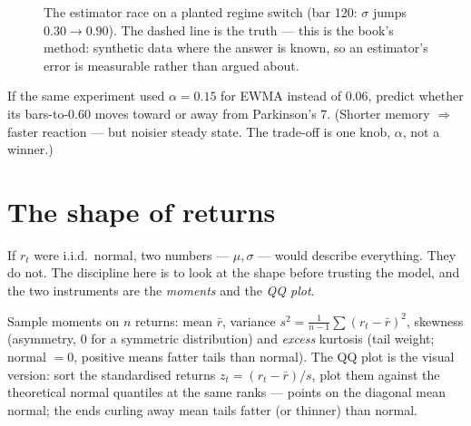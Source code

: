 \begin{figure}[ht]\centering

\caption{The estimator race on a planted regime switch (bar 120:
$\sigma$ jumps $0.30\to0.90$). The dashed line is the truth --- this
is the book's method: synthetic data where the answer is known, so an
estimator's error is measurable rather than argued about.}
\label{fig:volest}
\end{figure}

\begin{checkpoint}
If the same experiment used $\alpha=0.15$ for EWMA instead of
$0.06$, predict whether its bars-to-$0.60$ moves toward or away from
Parkinson's 7. (Shorter memory $\Rightarrow$ faster reaction --- but
noisier steady state. The trade-off is one knob, $\alpha$, not a
winner.)
\end{checkpoint}

\section{The shape of returns}\label{sec:shape}
If $r_t$ were i.i.d.\ normal, two numbers --- $\mu,\sigma$ --- would
describe everything. They do not. The discipline here is to look at
the shape before trusting the model, and the two instruments are the
\emph{moments} and the \emph{QQ plot}.

Sample moments on $n$ returns: mean $\bar r$, variance
$s^2=\frac{1}{n-1}\sum(r_t-\bar r)^2$, skewness (asymmetry, $0$ for a
symmetric distribution) and \emph{excess} kurtosis (tail weight;
normal $=0$, positive means fatter tails than normal). The QQ plot is
the visual version: sort the standardised returns $z_t=(r_t-\bar
r)/s$, plot them against the theoretical normal quantiles at the same
ranks --- points on the diagonal mean normal; the ends curling away
mean tails fatter (or thinner) than normal.

